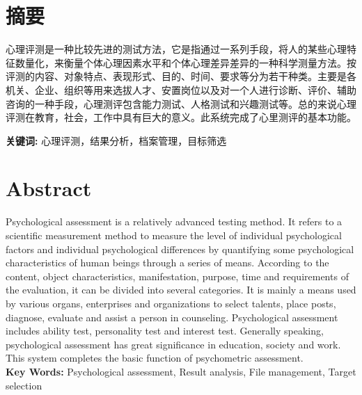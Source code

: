 \section*{ \centering 摘要}

\vskip0.5cm
心理评测是一种比较先进的测试方法，它是指通过一系列手段，将人的某些心理特征数量化，来衡量个体心理因素水平和个体心理差异差异的一种科学测量方法。按评测的内容、对象特点、表现形式、目的、时间、要求等分为若干种类。主要是各机关、企业、组织等用来选拔人才、安置岗位以及对一个人进行诊断、评价、辅助咨询的一种手段，心理测评包含能力测试、人格测试和兴趣测试等。总的来说心理评测在教育，社会，工作中具有巨大的意义。此系统完成了心里测评的基本功能。


\textbf{关键词:}  心理评测，结果分析，档案管理，目标筛选

\clearpage
\section*{ \centering \textbf{Abstract} }

Psychological assessment is a relatively advanced testing method. It refers to a scientific measurement method to measure the level of individual psychological factors and individual psychological differences by quantifying some psychological characteristics of human beings through a series of means. According to the content, object characteristics, manifestation, purpose, time and requirements of the evaluation, it can be divided into several categories. It is mainly a means used by various organs, enterprises and organizations to select talents, place posts, diagnose, evaluate and assist a person in counseling. Psychological assessment includes ability test, personality test and interest test. Generally speaking, psychological assessment has great significance in education, society and work. This system completes the basic function of psychometric assessment. \\

\textbf{Key Words:} Psychological assessment, Result analysis, File management, Target selection \\




